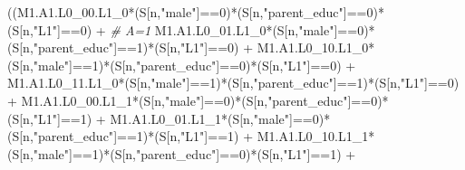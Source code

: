 \documentclass[
]{book}
\newenvironment{Shaded}{\begin{snugshade}}{\end{snugshade}}
\newcommand{\CommentTok}[1]{\textcolor[rgb]{0.56,0.35,0.01}{\textit{#1}}}
\newcommand{\DecValTok}[1]{\textcolor[rgb]{0.00,0.00,0.81}{#1}}
\newcommand{\NormalTok}[1]{#1}
\newcommand{\SpecialCharTok}[1]{\textcolor[rgb]{0.00,0.00,0.00}{#1}}
\newcommand{\StringTok}[1]{\textcolor[rgb]{0.31,0.60,0.02}{#1}}
\begin{document}
\begin{Shaded}
\begin{Highlighting}[]
\NormalTok{      ((M1.A1.L0\_00.L1\_0}\SpecialCharTok{*}\NormalTok{(S[n,}\StringTok{"male"}\NormalTok{]}\SpecialCharTok{==}\DecValTok{0}\NormalTok{)}\SpecialCharTok{*}\NormalTok{(S[n,}\StringTok{"parent\_educ"}\NormalTok{]}\SpecialCharTok{==}\DecValTok{0}\NormalTok{)}\SpecialCharTok{*}\NormalTok{(S[n,}\StringTok{"L1"}\NormalTok{]}\SpecialCharTok{==}\DecValTok{0}\NormalTok{) }\SpecialCharTok{+} \CommentTok{\# A\textquotesingle{}=1}
\NormalTok{          M1.A1.L0\_01.L1\_0}\SpecialCharTok{*}\NormalTok{(S[n,}\StringTok{"male"}\NormalTok{]}\SpecialCharTok{==}\DecValTok{0}\NormalTok{)}\SpecialCharTok{*}\NormalTok{(S[n,}\StringTok{"parent\_educ"}\NormalTok{]}\SpecialCharTok{==}\DecValTok{1}\NormalTok{)}\SpecialCharTok{*}\NormalTok{(S[n,}\StringTok{"L1"}\NormalTok{]}\SpecialCharTok{==}\DecValTok{0}\NormalTok{) }\SpecialCharTok{+}
\NormalTok{          M1.A1.L0\_10.L1\_0}\SpecialCharTok{*}\NormalTok{(S[n,}\StringTok{"male"}\NormalTok{]}\SpecialCharTok{==}\DecValTok{1}\NormalTok{)}\SpecialCharTok{*}\NormalTok{(S[n,}\StringTok{"parent\_educ"}\NormalTok{]}\SpecialCharTok{==}\DecValTok{0}\NormalTok{)}\SpecialCharTok{*}\NormalTok{(S[n,}\StringTok{"L1"}\NormalTok{]}\SpecialCharTok{==}\DecValTok{0}\NormalTok{) }\SpecialCharTok{+} 
\NormalTok{          M1.A1.L0\_11.L1\_0}\SpecialCharTok{*}\NormalTok{(S[n,}\StringTok{"male"}\NormalTok{]}\SpecialCharTok{==}\DecValTok{1}\NormalTok{)}\SpecialCharTok{*}\NormalTok{(S[n,}\StringTok{"parent\_educ"}\NormalTok{]}\SpecialCharTok{==}\DecValTok{1}\NormalTok{)}\SpecialCharTok{*}\NormalTok{(S[n,}\StringTok{"L1"}\NormalTok{]}\SpecialCharTok{==}\DecValTok{0}\NormalTok{) }\SpecialCharTok{+}
\NormalTok{          M1.A1.L0\_00.L1\_1}\SpecialCharTok{*}\NormalTok{(S[n,}\StringTok{"male"}\NormalTok{]}\SpecialCharTok{==}\DecValTok{0}\NormalTok{)}\SpecialCharTok{*}\NormalTok{(S[n,}\StringTok{"parent\_educ"}\NormalTok{]}\SpecialCharTok{==}\DecValTok{0}\NormalTok{)}\SpecialCharTok{*}\NormalTok{(S[n,}\StringTok{"L1"}\NormalTok{]}\SpecialCharTok{==}\DecValTok{1}\NormalTok{) }\SpecialCharTok{+}
\NormalTok{          M1.A1.L0\_01.L1\_1}\SpecialCharTok{*}\NormalTok{(S[n,}\StringTok{"male"}\NormalTok{]}\SpecialCharTok{==}\DecValTok{0}\NormalTok{)}\SpecialCharTok{*}\NormalTok{(S[n,}\StringTok{"parent\_educ"}\NormalTok{]}\SpecialCharTok{==}\DecValTok{1}\NormalTok{)}\SpecialCharTok{*}\NormalTok{(S[n,}\StringTok{"L1"}\NormalTok{]}\SpecialCharTok{==}\DecValTok{1}\NormalTok{) }\SpecialCharTok{+}
\NormalTok{          M1.A1.L0\_10.L1\_1}\SpecialCharTok{*}\NormalTok{(S[n,}\StringTok{"male"}\NormalTok{]}\SpecialCharTok{==}\DecValTok{1}\NormalTok{)}\SpecialCharTok{*}\NormalTok{(S[n,}\StringTok{"parent\_educ"}\NormalTok{]}\SpecialCharTok{==}\DecValTok{0}\NormalTok{)}\SpecialCharTok{*}\NormalTok{(S[n,}\StringTok{"L1"}\NormalTok{]}\SpecialCharTok{==}\DecValTok{1}\NormalTok{) }\SpecialCharTok{+}

\end{Highlighting}
\end{Shaded}
\end{document}
